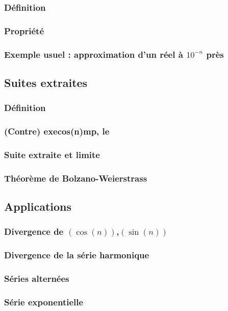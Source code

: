 \documentclass[12pt,a4paper,french]{book}
\begin{document}
			\subsubsection{Définition}
			\subsubsection{Propriété}
			\subsubsection{Exemple usuel : approximation d'un réel à $10^{-n}$ près}
		\subsection{Suites extraites}
			\subsubsection{Définition}
			\subsubsection{(Contre) execos(n)mp, le}
			\subsubsection{Suite extraite et limite}
			\subsubsection{Théorème de Bolzano-Weierstrass}
		\subsection{Applications}
			\subsubsection{Divergence de $(\cos(n))$,$(\sin(n))$}
			\subsubsection{Divergence de la série harmonique}
			\subsubsection{Séries alternées}
			\subsubsection{Série exponentielle}
\end{document}
